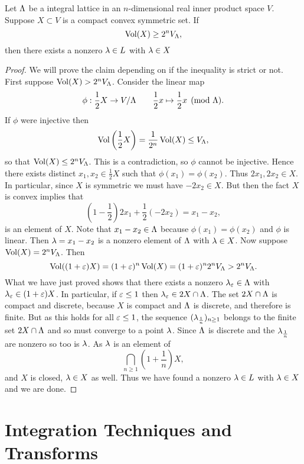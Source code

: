     \begin{theorem*}
      Let $\Lambda$ be a integral lattice in an $n$-dimensional real inner product space $V$. Suppose $X \subset V$ is a compact convex symmetric set. If
      \[
        \operatorname{\mathrm{Vol}}(X) \ge 2^{n}V_{\Lambda},
      \]
      then there exists a nonzero $\lambda \in L$ with $\lambda \in X$ 
    \end{theorem*}
    \begin{proof}
      We will prove the claim depending on if the inequality is strict or not. First suppose $\operatorname{\mathrm{Vol}}(X) > 2^{n}V_{\Lambda}$. Consider the linear map
      \[
        \phi:\frac{1}{2}X \to V/\Lambda \qquad \frac{1}{2}x \mapsto \frac{1}{2}x \pmod{\Lambda}.
      \]
      If $\phi$ were injective then
      \[
        \operatorname{\mathrm{Vol}}\left(\frac{1}{2}X\right) = \frac{1}{2^{n}}\operatorname{\mathrm{Vol}}(X) \le V_{\Lambda}, 
      \]
      so that $\operatorname{\mathrm{Vol}}(X) \le  2^{n}V_{\Lambda}$. This is a contradiction, so $\phi$ cannot be injective. Hence there exists distinct $x_{1},x_{2} \in \frac{1}{2}X$ such that $\phi(x_{1}) = \phi(x_{2})$. Thus $2x_{1},2x_{2} \in X$. In particular, since $X$ is symmetric we must have $-2x_{2} \in X$. But then the fact $X$ is convex implies that
      \[
        \left(1-\frac{1}{2}\right)2x_{1}+\frac{1}{2}(-2x_{2}) = x_{1}-x_{2},
      \]
      is an element of $X$. Note that $x_{1}-x_{2} \in \Lambda$ because $\phi(x_{1}) = \phi(x_{2})$ and $\phi$ is linear. Then $\lambda = x_{1}-x_{2}$ is a nonzero element of $\Lambda$ with $\lambda \in X$. Now suppose $\operatorname{\mathrm{Vol}}(X) = 2^{n}V_{\Lambda}$. Then
      \[
        \operatorname{\mathrm{Vol}}((1+\varepsilon)X) = (1+\varepsilon)^{n}\operatorname{\mathrm{Vol}}(X) = (1+\varepsilon)^{n}2^{n}V_{\Lambda} > 2^{n}V_{\Lambda}.
      \]
      What we have just proved shows that there exists a nonzero $\lambda_{\varepsilon} \in \Lambda$ with $\lambda_{\varepsilon} \in (1+\varepsilon)X$. In particular, if $\varepsilon \le 1$ then $\lambda_{\varepsilon} \in 2X \cap \Lambda$. The set $2X \cap \Lambda$ is compact and discrete, because $X$ is compact and $\Lambda$ is discrete, and therefore is finite. But as this holds for all $\varepsilon \le 1$, the sequence $(\lambda_{\frac{1}{n}})_{n \ge 1}$ belongs to the finite set $2X \cap \Lambda$ and so must converge to a point $\lambda$. Since $\Lambda$ is discrete and the $\lambda_{\frac{1}{n}}$ are nonzero so too is $\lambda$. As $\lambda$ is an element of
      \[
        \bigcap_{n \ge 1}\left(1+\frac{1}{n}\right)X,
      \]
      and $X$ is closed, $\lambda \in X$ as well. Thus we have found a nonzero $\lambda \in L$ with $\lambda \in X$ and we are done.
    \end{proof}
  \section{Integration Techniques and Transforms}
